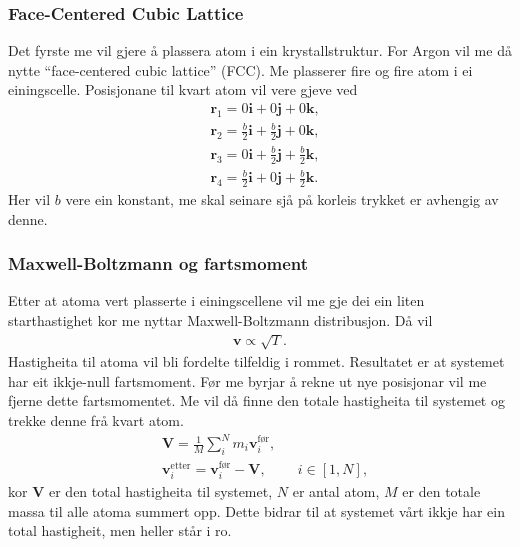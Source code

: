 \documentclass[12pt, a4paper]{article}
\theoremstyle{definition}
\newcommand{\vb}{\mathbf}
\begin{document}
        \subsubsection*{Face-Centered Cubic Lattice}
            Det fyrste me vil gjere å plassera atom i ein krystallstruktur. For Argon
            vil me då nytte ``face-centered cubic lattice'' (FCC). Me plasserer fire og fire atom i ei einingscelle. Posisjonane til kvart atom vil vere gjeve ved
            \begin{align*}
                &\vb{r}_1 = 0\vb{i} + 0\vb{j} + 0\vb{k}, \\
                &\vb{r}_2 = \frac{b}{2}\vb{i} + \frac{b}{2}\vb{j} + 0\vb{k}, \\
                &\vb{r}_3 = 0\vb{i} + \frac{b}{2}\vb{j} + \frac{b}{2}\vb{k}, \\
                &\vb{r}_4 = \frac{b}{2}\vb{i} + 0\vb{j} + \frac{b}{2}\vb{k}.
            \end{align*}
            Her vil $b$ vere ein konstant, me skal seinare sjå på korleis trykket er avhengig av denne. \\ %

        \subsubsection*{Maxwell-Boltzmann og fartsmoment}
            Etter at atoma vert plasserte i einingscellene vil me gje dei ein liten starthastighet kor me nyttar Maxwell-Boltzmann distribusjon. Då vil
            \begin{align*}
                \vb{v} \propto \sqrt{T}.
            \end{align*}
            Hastigheita til atoma vil bli fordelte tilfeldig i rommet. Resultatet er at systemet har eit ikkje-null fartsmoment. Før me byrjar å rekne ut nye posisjonar vil
            me fjerne dette fartsmomentet. Me vil då finne den totale hastigheita til systemet og trekke denne frå kvart atom.
            \begin{align*}
                &\vb{V} = \frac{1}{M}\sum_i^N m_i\vb{v}_{i}^{\text{før}}, \\
                &\vb{v}_{i}^{\text{etter}} = \vb{v}_{i}^{\text{før}} - \vb{V}, \qquad \ i \in [1, N],
            \end{align*}
            kor $\vb{V}$ er den total hastigheita til systemet, $N$ er antal atom, $M$ er den totale massa til alle atoma summert opp. Dette bidrar til at systemet vårt
            ikkje har ein total hastigheit, men heller står i ro. \\
\end{document}
